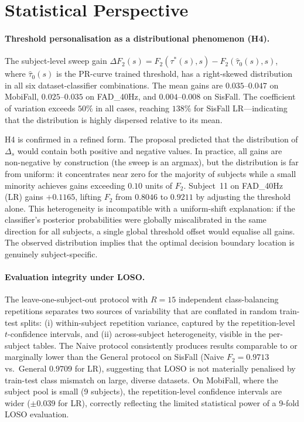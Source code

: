 \section{Statistical Perspective}
\label{subsec:conclusion-stat}

\paragraph{Threshold personalisation as a distributional phenomenon (H4).}
The subject-level sweep gain $\Delta F_2(s) = F_2(\tau^*(s),s) - F_2(\hat\tau_0(s),s)$,
where $\hat\tau_0(s)$ is the PR-curve trained threshold, has a right-skewed
distribution in all six dataset-classifier combinations.  The mean gains are
$0.035$--$0.047$ on MobiFall, $0.025$--$0.035$ on FAD\_40Hz, and
$0.004$--$0.008$ on SisFall.  The coefficient of variation exceeds $50\%$ in all
cases, reaching $138\%$ for SisFall LR---indicating that the distribution is highly
dispersed relative to its mean.

H4 is confirmed in a refined form.  The proposal predicted that the distribution
of $\Delta_s$ would contain both positive and negative values.  In practice, all
gains are non-negative by construction (the sweep is an argmax), but the
distribution is far from uniform: it concentrates near zero for the majority of
subjects while a small minority achieves gains exceeding $0.10$ units of $F_2$.
Subject~11 on FAD\_40Hz (LR) gains $+0.1165$, lifting $F_2$ from $0.8046$ to
$0.9211$ by adjusting the threshold alone.  This heterogeneity is incompatible with
a uniform-shift explanation: if the classifier's posterior probabilities were
globally miscalibrated in the same direction for all subjects, a single global
threshold offset would equalise all gains.  The observed distribution implies that
the optimal decision boundary location is genuinely subject-specific.

\paragraph{Evaluation integrity under LOSO.}
The leave-one-subject-out protocol with $R=15$ independent class-balancing
repetitions separates two sources of variability that are conflated in random
train-test splits: (i) within-subject repetition variance, captured by the
repetition-level $t$-confidence intervals, and (ii) across-subject heterogeneity,
visible in the per-subject tables.  The Naive protocol consistently produces results
comparable to or marginally lower than the General protocol on SisFall (Naive
$F_2=0.9713$ vs.\ General $0.9709$ for LR), suggesting that LOSO is not
materially penalised by train-test class mismatch on large, diverse datasets.  On
MobiFall, where the subject pool is small (9 subjects), the repetition-level
confidence intervals are wider ($\pm0.039$ for LR), correctly reflecting the
limited statistical power of a 9-fold LOSO evaluation.

